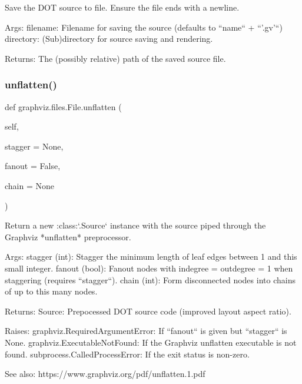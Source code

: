 \begin{DoxyVerb}Save the DOT source to file. Ensure the file ends with a newline.

Args:
    filename: Filename for saving the source (defaults to ``name`` + ``'.gv'``)
    directory: (Sub)directory for source saving and rendering.

Returns:
    The (possibly relative) path of the saved source file.
\end{DoxyVerb}
 \mbox{\label{classgraphviz_1_1files_1_1File_adbb901a504e9b3cd76b5b24bb10fc394}} 
\subsubsection{\texorpdfstring{unflatten()}{unflatten()}}
{\footnotesize\ttfamily def graphviz.\+files.\+File.\+unflatten (\begin{DoxyParamCaption}\item[{}]{self,  }\item[{}]{stagger = {\ttfamily None},  }\item[{}]{fanout = {\ttfamily False},  }\item[{}]{chain = {\ttfamily None} }\end{DoxyParamCaption})}

\begin{DoxyVerb}Return a new :class:`.Source` instance with the source piped through the Graphviz *unflatten* preprocessor.

Args:
    stagger (int): Stagger the minimum length of leaf edges between 1 and this small integer.
    fanout (bool): Fanout nodes with indegree = outdegree = 1 when staggering (requires ``stagger``).
    chain (int): Form disconnected nodes into chains of up to this many nodes.

Returns:
    Source: Prepocessed DOT source code (improved layout aspect ratio).

Raises:
    graphviz.RequiredArgumentError: If ``fanout`` is given but ``stagger`` is None.
    graphviz.ExecutableNotFound: If the Graphviz unflatten executable is not found.
    subprocess.CalledProcessError: If the exit status is non-zero.

See also:
    https://www.graphviz.org/pdf/unflatten.1.pdf
\end{DoxyVerb}
 \mbox{\label{classgraphviz_1_1files_1_1File_a5595a991fd13abf5bcb6188f81ac5abd}} 
